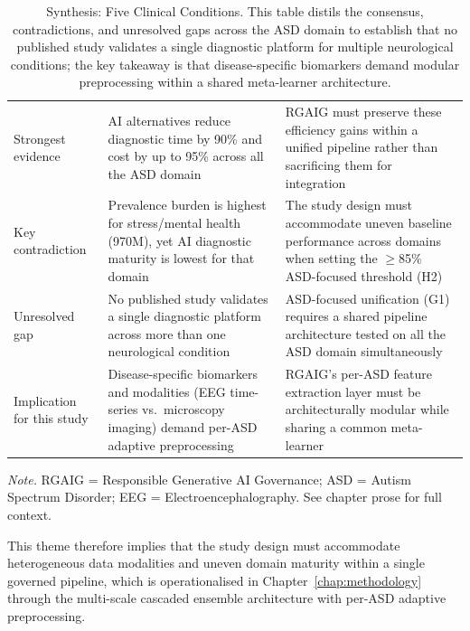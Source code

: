 {\tablestripes\tablefontsize
\begin{xltabular}{\textwidth}{@{} p{2.5cm} p{5.8cm} p{6.0cm} @{}}
\caption[Synthesis: Five Clinical Conditions]{Synthesis: Five Clinical Conditions. This table distils the consensus, contradictions, and unresolved gaps across the ASD domain to establish that no published study validates a single diagnostic platform for multiple neurological conditions; the key takeaway is that disease-specific biomarkers demand modular preprocessing within a shared meta-learner architecture.}\label{tab:synth_clinical_conditions} \\
\toprule
{} &  &  \\
\midrule
\endfirsthead
\endhead
\bottomrule
\endlastfoot
Strongest evidence & AI alternatives reduce diagnostic time by 90\% and cost by up to 95\% across all the ASD domain & RGAIG must preserve these efficiency gains within a unified pipeline rather than sacrificing them for integration \\
\addlinespace
Key contradiction & Prevalence burden is highest for stress/mental health (970M), yet AI diagnostic maturity is lowest for that domain & The study design must accommodate uneven baseline performance across domains when setting the $\geq$85\% ASD-focused threshold (H2) \\
\addlinespace
Unresolved gap & No published study validates a single diagnostic platform across more than one neurological condition & ASD-focused unification (G1) requires a shared pipeline architecture tested on all the ASD domain simultaneously \\
\addlinespace
Implication for this study & Disease-specific biomarkers and modalities (EEG time-series vs.\ microscopy imaging) demand per-ASD adaptive preprocessing & RGAIG's per-ASD feature extraction layer must be architecturally modular while sharing a common meta-learner \\
\end{xltabular}}
\vspace{0.3em}\noindent\textit{Note.} RGAIG = Responsible Generative AI Governance; ASD = Autism Spectrum Disorder; EEG = Electroencephalography. See chapter prose for full context.

\noindent This theme therefore implies that the study design must accommodate heterogeneous data modalities and uneven domain maturity within a single governed pipeline, which is operationalised in Chapter~\ref{chap:methodology} through the multi-scale cascaded ensemble architecture with per-ASD adaptive preprocessing.

